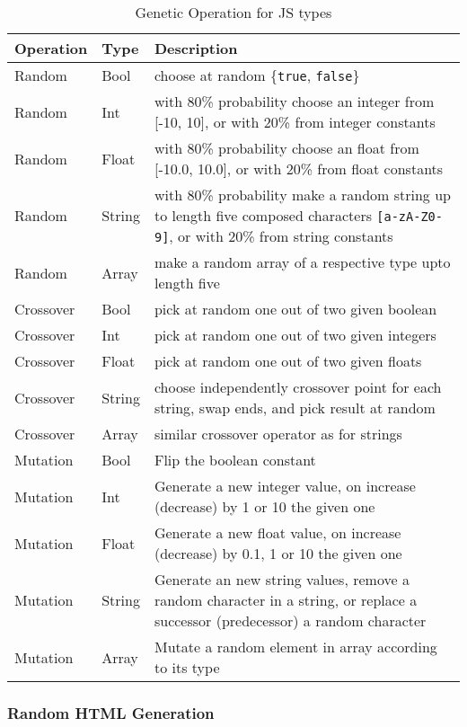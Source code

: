 \documentclass[sigconf]{acmart}
\begin{document}
\begin{table}
  \caption{Genetic Operation for JS types}
  \label{tbl.gen.oper.js.types}
    \footnotesize
  \begin{tabular}{p{1cm}|p{5mm}|p{6cm}}
    \toprule
    \textbf{Operation} & \textbf{Type} & \textbf{Description} \\
    \hline
    Random & Bool & choose at random \{\texttt{true}, \texttt{false}\} \\
    Random & Int  & with 80\% probability choose an integer from [-10, 10], or with 20\% from integer constants\\
    Random & Float & with 80\% probability choose an float from [-10.0, 10.0], or with 20\% from float constants\\
    Random & String & with 80\% probability make a random string up to length five composed characters \texttt{[a-zA-Z0-9]}, or with 20\% from string constants\\
    Random & Array & make a random array of a respective type upto length five\\
    \hline
    Crossover & Bool   & pick at random one out of two given boolean \\
    Crossover & Int    & pick at random one out of two given integers\\
    Crossover & Float  & pick at random one out of two given floats\\
    Crossover & String & choose independently crossover point for each string, swap ends, and pick result at random\\
    Crossover & Array & similar crossover operator as for strings\\
    \hline
    Mutation & Bool & Flip the boolean constant\\
    Mutation & Int  & Generate a new integer value, on increase (decrease) by 1 or 10 the given one\\
    Mutation & Float  & Generate a new float value, on increase (decrease) by 0.1, 1 or 10 the given one\\
    Mutation & String & Generate an new string values, remove a random character in a string, or replace a successor (predecessor) a random character\\
    Mutation & Array & Mutate a random element in array according to its type\\
    \bottomrule
  \end{tabular}
\end{table}

\subsubsection{Random HTML Generation}
\label{sub.sub.sec.random.html}
\end{document}
